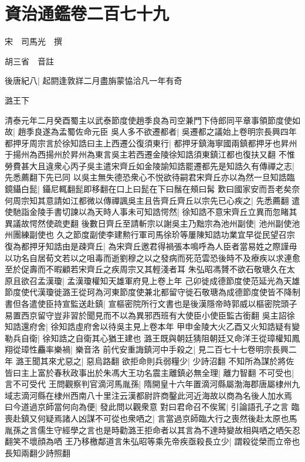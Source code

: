 \chapter{資治通鑑卷二百七十九}
宋　司馬光　撰

胡三省　音註

後唐紀八|{
	起閼逢敦牂二月盡旃蒙恊洽凡一年有奇}


潞王下

清泰元年二月癸酉蜀主以武泰節度使趙季良為司空兼門下侍郎同平章事領節度使如故|{
	趙季良遂為孟蜀佐命元臣}
吳人多不欲遷都者|{
	吳遷都之議始上卷明宗長興四年}
都押牙周宗言於徐知誥曰主上西遷公復須東行|{
	都押牙鎮海寧國兩鎮都押牙也昇州于揚州為西揚州於昇州為東言吳主若西遷金陵徐知誥須東鎮江都也復扶又翻}
不惟勞費甚大且違衆心丙子吳主遣宋齊丘如金陵諭知誥罷遷都先是知誥久有傳禪之志|{
	先悉薦翻下先已同}
以吳主無失德恐衆心不悦欲待嗣君宋齊丘亦以為然一旦知誥臨鏡鑷白髭|{
	鑷尼輒翻髭即移翻在口上曰髭在下曰鬚在頰曰髯}
歎曰國家安而吾老矣奈何周宗知其意請如江都微以傳禪諷吳主且告齊丘齊丘以宗先已心疾之|{
	先悉薦翻}
遣使馳詣金陵手書切諫以為天時人事未可知誥愕然|{
	徐知誥不意宋齊丘立異而忽睹其異議故愕然使疏吏翻}
後數日齊丘至請斬宗以謝吳主乃黜宗為池州副使|{
	池州副使池州團練副使也}
久之節度副使李建勲行軍司馬徐玠等屢陳知誥功業宜早從民望召宗復為都押牙知誥由是疎齊丘|{
	為宋齊丘邀君得禍張本鳴呼為人臣者當易姓之際謹毋以功名自居荀文若以之咀毒而逝劉穆之以之發病而死范雲恐後時不及療疾以求連愈至於促壽而不暇顧若宋齊丘之疾周宗又其輕淺者耳}
朱弘昭馮贇不欲石敬瑭久在太原且欲召孟漢瓊|{
	孟漢瓊權知天雄軍府見上卷上年}
己卯徙成德節度使范延光為天雄節度使代漢瓊徙潞王從珂為河東節度使兼北都留守徙石敬瑭為成德節度使皆不降制書但各遣使臣持宣監送赴鎮|{
	宣樞密院所行文書也是後漢隱帝時郭威以樞密院頭子易置西京留守豈非習於聞見而不以為異邪西班有大使臣小使臣監古銜翻}
吳主詔徐知誥還府舍|{
	徐知誥虛府舍以待吳主見上卷本年}
甲申金陵大火乙酉又火知誥疑有變勒兵自衛|{
	徐知誥之自衛其心猶王建也}
潞王既與朝廷猜阻朝廷又命洋王從璋權知鳳翔從璋性麤率樂禍|{
	樂音洛}
前代安重誨鎮河中手殺之|{
	見二百七十七卷明宗長興二年}
潞王聞其來尤惡之|{
	惡烏路翻}
欲拒命則兵弱糧少|{
	少詩沼翻}
不知所為謀於將佐皆曰主上富於春秋政事出於朱馮大王功名震主離鎮必無全理|{
	離力智翻}
不可受也|{
	言不可受代}
王問觀察判官滴河馬胤孫|{
	隋開皇十六年置滴河縣屬渤海郡唐屬棣州九域志滴河縣在棣州西南八十里注云漢都尉許商鑿此河近海故以商為名後人加水焉}
曰今道過京師當何向為便|{
	發此問以觀衆意}
對曰君命召不俟駕|{
	引論語孔子之言}
臨喪赴鎮又何疑焉諸人凶謀不可從也衆哂之|{
	言當過京師臨大行之喪然後赴太原也馬胤孫之言儒生守經學之言也是時勸潞王拒命者以其言為不達時變故相與哂之哂矢忍翻笑不壞顔為哂}
王乃移檄鄰道言朱弘昭等乘先帝疾亟殺長立少|{
	謂殺從榮而立帝也長知兩翻少詩照翻}

